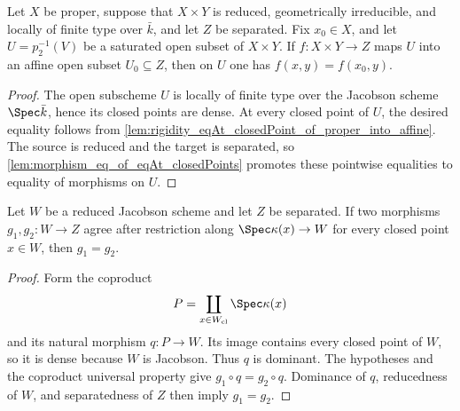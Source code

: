 \begin{lemma}
  \label{lem:rigidity_eqOn_saturated_open_to_affine}
  \leanok
  Let \(X\) be proper, suppose that \(X\times Y\) is reduced, geometrically
  irreducible, and locally of finite type over \(\bar k\), and let \(Z\) be separated.
  Fix \(x_0\in X\), and let \(U=p_2^{-1}(V)\) be a saturated open subset of
  \(X\times Y\).  If \(f\colon X\times Y\to Z\) maps \(U\) into an affine open
  subset \(U_0\subseteq Z\), then on \(U\) one has \(f(x,y)=f(x_0,y)\).
\end{lemma}
\begin{proof}
  \leanok
  The open subscheme \(U\) is locally of finite type over the Jacobson scheme
  \(\Spec\bar k\), hence its closed points are dense.  At every closed point of
  \(U\), the desired equality follows from
  \cref{lem:rigidity_eqAt_closedPoint_of_proper_into_affine}.  The source is reduced
  and the target is separated, so
  \cref{lem:morphism_eq_of_eqAt_closedPoints} promotes these pointwise equalities to
  equality of morphisms on \(U\).
\end{proof}

\begin{lemma}
  \label{lem:morphism_eq_of_eqAt_closedPoints}
  \leanok
  Let \(W\) be a reduced Jacobson scheme and let \(Z\) be separated.  If two
  morphisms \(g_1,g_2\colon W\to Z\) agree after restriction along
  \(\Spec\kappa(x)\to W\) for every closed point \(x\in W\), then \(g_1=g_2\).
\end{lemma}
\begin{proof}
  \leanok
  Form the coproduct
  \[
    P=\coprod_{x\in W_{\mathrm{cl}}}\Spec\kappa(x)
  \]
  and its natural morphism \(q\colon P\to W\).  Its image contains every closed
  point of \(W\), so it is dense because \(W\) is Jacobson.  Thus \(q\) is dominant.
  The hypotheses and the coproduct universal property give
  \(g_1\circ q=g_2\circ q\).  Dominance of \(q\), reducedness of \(W\), and
  separatedness of \(Z\) then imply \(g_1=g_2\).
\end{proof}

